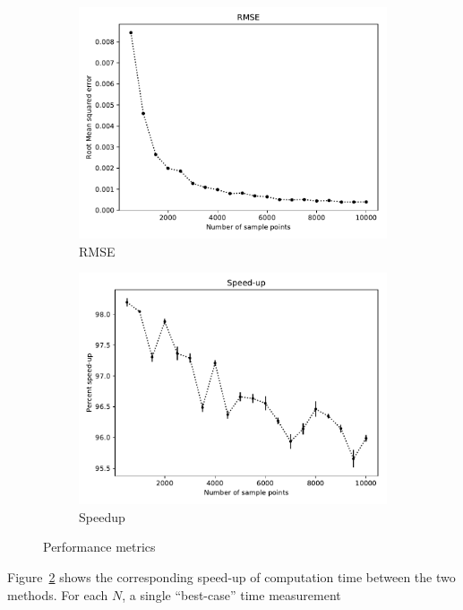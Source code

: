 \documentclass{article}
\begin{document}
\begin{figure}[h]
  \centering
  \begin{subfigure}[b]{0.48\textwidth}
    \centering
    \includegraphics[width=0.9\linewidth]{../plot_rmse/rmse}
    \caption{RMSE}
    \label{fig:rmse}
  \end{subfigure}
  \hspace{0.5em}
  \begin{subfigure}[b]{0.48\textwidth}
    \centering
    \includegraphics[width=0.9\linewidth]{../plot_speedup/speedup}
    \caption{Speedup}
    \label{fig:speedup}
  \end{subfigure}
  \caption{Performance metrics}
  \label{fig:metrics}
\end{figure}
Figure~\ref{fig:speedup} shows the corresponding speed-up of computation time
between the two methods. For each $N$, a single ``best-case'' time measurement
\end{document}
